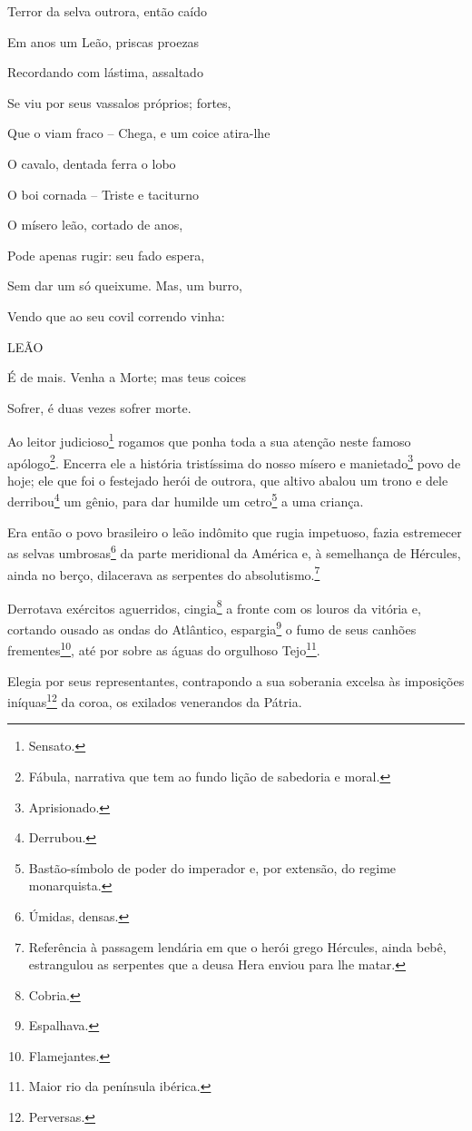 \asterisc{}

Terror da selva outrora, então caído

Em anos um Leão, priscas proezas

Recordando com lástima, assaltado

Se viu por seus vassalos próprios; fortes,

Que o viam fraco -- Chega, e um coice atira-lhe

O cavalo, dentada ferra o lobo

O boi cornada -- Triste e taciturno

O mísero leão, cortado de anos,

Pode apenas rugir: seu fado espera,

Sem dar um só queixume. Mas, um burro,

Vendo que ao seu covil correndo vinha:

LEÃO

É de mais. Venha a Morte; mas teus coices

Sofrer, é duas vezes sofrer morte.

\textbf{\asterisc{}}

Ao leitor judicioso\footnote{Sensato.} rogamos que ponha toda a sua
atenção neste famoso apólogo\footnote{Fábula, narrativa que tem ao
  fundo lição de sabedoria e moral.}. Encerra ele a história tristíssima
do nosso mísero e manietado\footnote{Aprisionado.} povo de hoje; ele
que foi o festejado herói de outrora, que altivo abalou um trono e dele
derribou\footnote{Derrubou.} um gênio, para dar humilde um
cetro\footnote{Bastão-símbolo de poder do imperador e, por extensão,
  do regime monarquista.} a uma criança.

Era então o povo brasileiro o leão indômito que rugia impetuoso, fazia
estremecer as selvas umbrosas\footnote{Úmidas, densas.} da parte
meridional da América e, à semelhança de Hércules, ainda no berço,
dilacerava as serpentes do absolutismo.\footnote{Referência à passagem
  lendária em que o herói grego Hércules, ainda bebê, estrangulou as
  serpentes que a deusa Hera enviou para lhe matar.}

Derrotava exércitos aguerridos, cingia\footnote{Cobria.} a fronte com
os louros da vitória e, cortando ousado as ondas do Atlântico,
espargia\footnote{Espalhava.} o fumo de seus canhões
frementes\footnote{Flamejantes.}, até por sobre as águas do orgulhoso
Tejo\footnote{Maior rio da península ibérica.}.

Elegia por seus representantes, contrapondo a sua soberania excelsa às
imposições iníquas\footnote{Perversas.} da coroa, os exilados
venerandos da Pátria.

